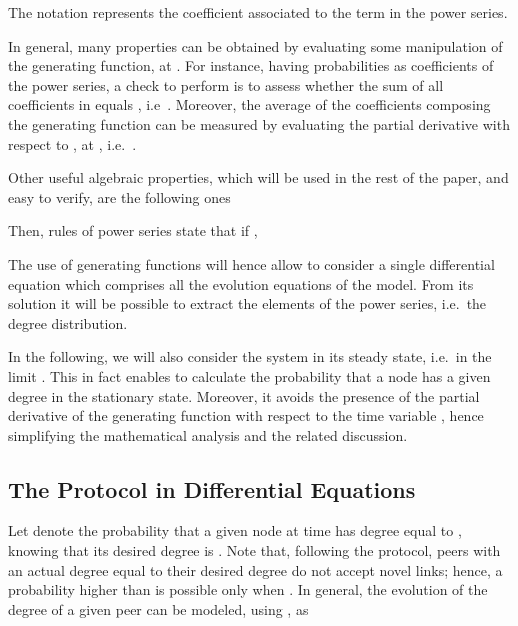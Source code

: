 \documentclass[a4paper,twosided]{article}
\begin{document}
The notation  represents the coefficient associated to the term  in the power series.

In general, many properties can be obtained by evaluating some manipulation of the generating function, at . For instance, having probabilities as coefficients of the power series, a check to perform is to assess whether the sum of all coefficients in  equals , i.e~. Moreover, the average of the coefficients composing the generating function can be measured by evaluating the partial derivative with respect to ,  at , i.e.~.

Other useful algebraic properties, which will be used in the rest of the paper, and easy to verify, are the following ones

Then, rules of power series state that if , 


The use of generating functions will hence allow to consider a single differential equation which comprises all the evolution equations of the model. From its solution it will be possible to extract the elements of the power series, i.e.~the degree distribution.

In the following, we will also consider the system in its steady state, i.e.~in the limit . This in fact enables to calculate the probability that a node has a given degree in the stationary state. Moreover, it avoids the presence of the partial derivative of the generating function with respect to the time variable , hence simplifying the mathematical analysis and the related discussion.

\subsection{The Protocol in Differential Equations}

Let  denote the probability that a given node at time  has degree equal to , knowing that its desired degree is . Note that, following the protocol, peers with an actual degree equal to their desired degree do not accept novel links; hence, a probability higher than  is possible only when . In general, the evolution of the degree of a given peer can be modeled, using , as
\end{document}

